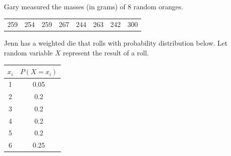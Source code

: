 \documentclass[12pt,letterpaper,addpoints]{exam}
\begin{document}
\begin{questions}

\newpage

\question[10] Gary measured the masses (in grams) of 8 random oranges.
\begin{center}
\begin{tabular}{c c c c c c c c}
259 & 254 & 259 & 267 & 244 & 263 & 242 & 300
\end{tabular}
\end{center}

\newpage

\question[10] Jenn has a weighted die that rolls with probability distribution below. Let random variable $X$ represent the result of a roll.
\vspace{10pt}

{\large
\begin{tabular}{|c|c|}\hline 
$x_i$ & $P(X=x_i)$ \\ \hline
1 & 0.05 \\
2 & 0.2 \\
3 & 0.2\\
4 & 0.2\\
5 & 0.2\\
6 & 0.25\\\hline
\end{tabular}
}

\vspace{10pt}
\begin{parts}

\end{parts}
\end{questions}
\end{document}
